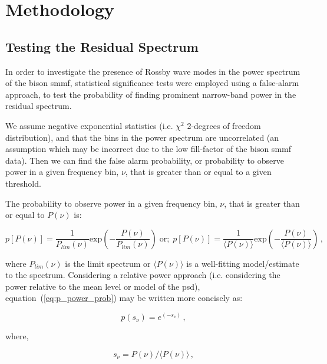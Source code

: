 \section{Methodology}\label{sec:r-mode_method}

\subsection{Testing the Residual Spectrum}
In order to investigate the presence of Rossby wave modes in the power spectrum of the \gls{bison} \gls{smmf}, statistical significance tests were employed using a false-alarm approach, to test the probability of finding prominent narrow-band power in the residual spectrum.

We assume negative exponential statistics (i.e. $\chi^2$ 2-degrees of freedom distribution), and that the bins in the power spectrum are uncorrelated (an assumption which may be incorrect due to the low fill-factor of the \gls{bison} \gls{smmf} data). Then we can find the false alarm probability, or probability to observe power in a given frequency bin, $\nu$, that is greater than or equal to a given threshold.

The probability to observe power in a given frequency bin, $\nu$, that is greater than or equal to $P(\nu)$ is:

\begin{equation}
p[P(\nu)] = \frac{1}{P_{lim}(\nu)} \mathrm{exp}\left(-\frac{P(\nu)}{P_{lim}(\nu)}\right) \; \mathrm{or; } \; p[P(\nu)] = \frac{1}{\langle P(\nu) \rangle} \mathrm{exp}\left(-\frac{P(\nu)}{\langle P(\nu) \rangle}\right) \, ,
\label{eq:p_power_prob}
\end{equation}


where $P_{lim}(\nu)$ is the limit spectrum or $\langle P(\nu) \rangle$ is a well-fitting model/estimate to the spectrum. Considering a relative power approach (i.e. considering the power relative to the mean level or model of the \gls{psd}), equation~(\ref{eq:p_power_prob}) may be written more concisely as:

\begin{equation}
p(s_{\nu}) = e^{(-s_{\nu})} \, ,
\label{eq:p_power_prob_concise}
\end{equation}

where,

\begin{equation}
s_{\nu} = P(\nu)/\langle P(\nu) \rangle \, ,
\label{eq:s_v}
\end{equation}

